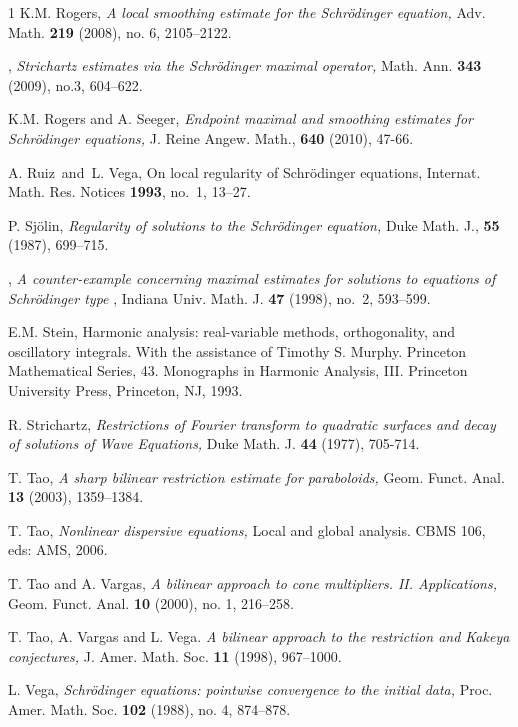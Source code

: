 \documentclass[11pt]{amsart}
\theoremstyle{definition}
\numberwithin{theorem}{section}
\numberwithin{definition}{section}
\numberwithin{equation}{section}
\def\emph#1{{\it #1 }}
\begin{document}
\begin{thebibliography}{1}
  K.M. Rogers,  \emph{A local smoothing estimate for the Schr\"odinger equation,} Adv. Math. {\bf 219} (2008), no.
6, {2105--2122}.

  \bysame ,  \emph{Strichartz estimates via the Schr\"odinger maximal operator,} Math. Ann. {\bf 343} (2009), no.3, {604--622}.

  K.M. Rogers and A. Seeger,  \emph{Endpoint maximal and smoothing estimates for Schr\"odinger equations,} J. Reine Angew. Math.,
{\bf  640}  (2010), 47-66.

 A. Ruiz\ and\ L. Vega, On local regularity of Schr\"odinger equations, Internat. Math. Res. Notices {\bf 1993}, no.~1, 13--27.



 P. Sj{\"o}lin,
\emph{Regularity of solutions to the Schr\"odinger equation,}
  {Duke Math. J.}, {\bf 55} (1987),   {699--715}.


 \bysame, \emph{A counter-example concerning maximal estimates for solutions to equations of Schr\"odinger type}, Indiana Univ. Math. J. {\bf 47} (1998), no.~2, 593--599.

 E.M. Stein, Harmonic analysis: real-variable methods, orthogonality, and oscillatory integrals. With the assistance of Timothy S. Murphy. Princeton Mathematical Series, 43. Monographs in Harmonic Analysis, III. Princeton University Press, Princeton, NJ, 1993.


 R. Strichartz, \emph{Restrictions of Fourier transform to quadratic surfaces and decay of
solutions of Wave Equations,} Duke Math. J. \textbf{44} (1977), 705-714.

 T. Tao,
\emph{A sharp  bilinear restriction estimate for paraboloids,} Geom.
Funct. Anal. {\bf 13} (2003), 1359--1384.

 T. Tao, \emph{Nonlinear dispersive equations,} Local and global analysis. CBMS 106, eds: AMS, 2006.


T.  Tao and A.  Vargas, \emph{A bilinear approach to cone multipliers. II. Applications,} Geom. Funct. Anal. {\bf 10}  (2000), no. 1, 216--258.

T. Tao, A. Vargas and L. Vega. \emph{A bilinear approach to the
restriction and Kakeya conjectures,} J. Amer. Math. Soc.  {\bf 11}
(1998), 967--1000.


 L. Vega,
\emph{Schr\"odinger equations: pointwise convergence to the initial
data,} Proc. Amer. Math. Soc.  {\bf 102}  (1988),  no. 4, 874--878.


\end{thebibliography}
\end{document}
